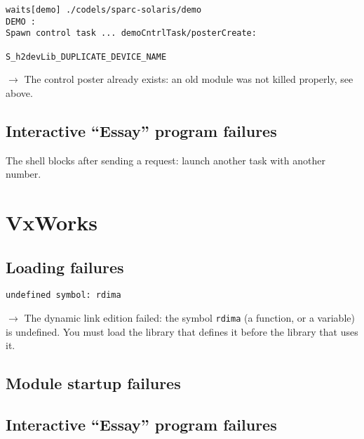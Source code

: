 \begin{center}\begin{cartouche}\small\begin{verbatim}
waits[demo] ./codels/sparc-solaris/demo
DEMO :
Spawn control task ... demoCntrlTask/posterCreate:
                                              S_h2devLib_DUPLICATE_DEVICE_NAME
\end{verbatim}\end{cartouche}\end{center}

$\rightarrow$ The  control poster already  exists: an  old module was not
killed properly, see above.


\subsection{Interactive ``Essay'' program failures}

The shell  blocks   after sending  a  request: launch  another  task with
another number.


\section{VxWorks}

\subsection{Loading failures}

\begin{center}\begin{cartouche}\small\begin{verbatim}
undefined symbol: rdima
\end{verbatim}\end{cartouche}\end{center}

$\rightarrow$ The dynamic link edition failed: the  symbol {\tt rdima} (a
function, or  a variable) is undefined. You   must load the  library that
defines it before the library that uses it.


\subsection{Module startup failures}

\subsection{Interactive ``Essay'' program failures}

